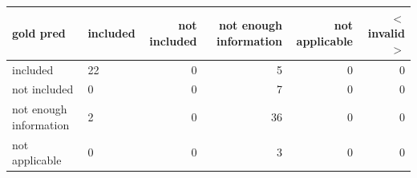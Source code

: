\begin{tabular}{llrrrr}
\toprule
gold  pred & included & not included & not enough information & not applicable & $<$invalid$>$ \\
\midrule
included & 22 & 0 & 5 & 0 & 0 \\
not included & 0 & 0 & 7 & 0 & 0 \\
not enough information & 2 & 0 & 36 & 0 & 0 \\
not applicable & 0 & 0 & 3 & 0 & 0 \\
\bottomrule
\end{tabular}
